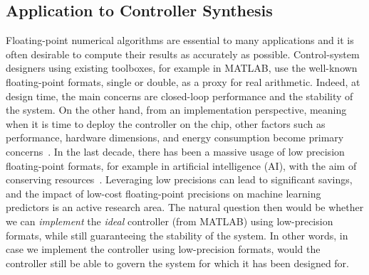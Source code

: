 \subsection{Application to Controller Synthesis}
\label{controllers}
%
Floating-point numerical algorithms are essential to many applications and it is often desirable to compute their results as accurately as possible.
%
Control-system designers using existing toolboxes, for example in MATLAB, use the well-known floating-point formats, single or double, as a proxy for real arithmetic. 
%
Indeed, at design time, the main concerns are closed-loop performance and the stability of the system.
%
%
%
On the other hand, from an implementation perspective, meaning when it is time to deploy the controller on the chip, other factors such as performance, hardware dimensions, and energy consumption become primary concerns~\cite{suardi}.
%
In the last decade, there has been a massive usage of low precision floating-point formats, for example in artificial intelligence (AI), with the aim of conserving resources~\cite{fppower}.
%
Leveraging low precisions can lead to significant savings, and the impact of low-cost floating-point precisions on machine learning predictors is an active research area.
%
The natural question then would be whether we can \emph{implement} the \emph{ideal} controller (from MATLAB) using low-precision formats, while still guaranteeing the stability of the system.
%
In other words, in case we implement the controller using low-precision formats, would the controller still be able to govern the system for which it has been designed for.
%
%

